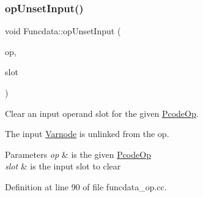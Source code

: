 \subsubsection{\texorpdfstring{opUnsetInput()}{opUnsetInput()}}
{\footnotesize\ttfamily void Funcdata\+::op\+Unset\+Input (\begin{DoxyParamCaption}\item[{\mbox{\hyperlink{class_pcode_op}{Pcode\+Op}} $\ast$}]{op,  }\item[{int4}]{slot }\end{DoxyParamCaption})}



Clear an input operand slot for the given \mbox{\hyperlink{class_pcode_op}{Pcode\+Op}}. 

The input \mbox{\hyperlink{class_varnode}{Varnode}} is unlinked from the op. 
\begin{DoxyParams}{Parameters}
{\em op} & is the given \mbox{\hyperlink{class_pcode_op}{Pcode\+Op}} \\
\hline
{\em slot} & is the input slot to clear \\
\hline
\end{DoxyParams}


Definition at line 90 of file funcdata\+\_\+op.\+cc.

